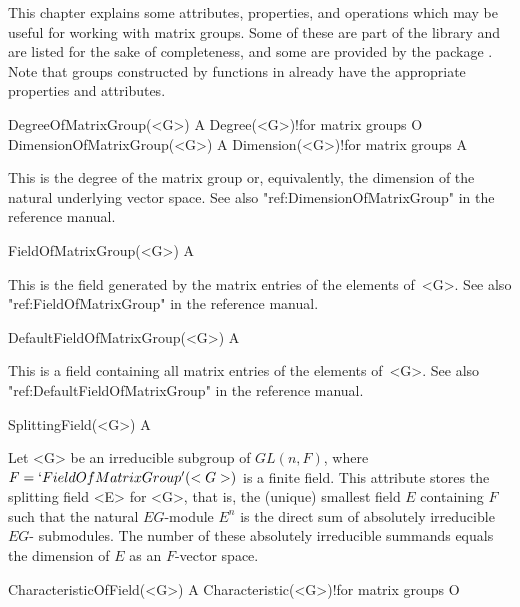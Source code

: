 
This chapter explains some attributes, properties, and operations which may
be useful for working with matrix groups. Some of these are part of the 
{\GAP} library and are listed for the sake of completeness, and some
are provided by the package {\IRREDSOL}. Note that  groups constructed
by functions in {\IRREDSOL} already have the appropriate properties and
attributes. 


\null


\>DegreeOfMatrixGroup(<G>) A
\>Degree(<G>)!{for matrix groups} O
\>DimensionOfMatrixGroup(<G>) A
\>Dimension(<G>)!{for matrix groups} A

This is the degree of the matrix group or, equivalently, the dimension of the
natural underlying vector space. See also "ref:DimensionOfMatrixGroup" in the {\GAP} reference manual.

\>FieldOfMatrixGroup(<G>) A

This is the field generated by the matrix entries of the elements of~<G>. See also 
"ref:FieldOfMatrixGroup" in the {\GAP} reference manual.

\>DefaultFieldOfMatrixGroup(<G>) A

This is a field containing all matrix entries of the elements of~<G>. See also 
"ref:DefaultFieldOfMatrixGroup" in the {\GAP} reference manual.

\>SplittingField(<G>) A

Let <G> be an irreducible subgroup of $GL(n, F)$, where $F =  `FieldOfMatrixGroup'(<G>)$
is a finite field. This attribute stores the splitting field <E> for <G>, that is,
the (unique) smallest field $E$ containing $F$ such 
that the natural $E G$-module $E^n$ is the direct sum of absolutely irreducible $E G$-
submodules. The number of these absolutely irreducible summands equals the dimension of $E$
as an $F$-vector space.

\>CharacteristicOfField(<G>) A
\>Characteristic(<G>)!{for matrix groups} O

